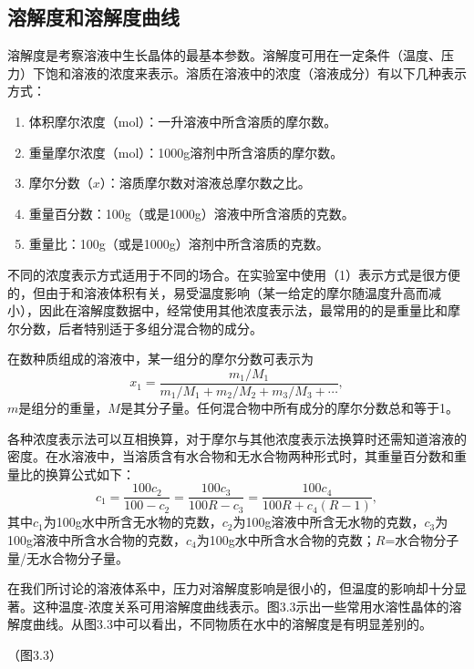 ﻿\subsection{溶解度和溶解度曲线}
溶解度是考察溶液中生长晶体的最基本参数。溶解度可用在一定条件（温度、压力）下饱和溶液的浓度来表示。溶质在溶液中的浓度（溶液成分）有以下几种表示方式：
\begin{enumerate}[(1)]\itemsep -0.5ex
\item 体积摩尔浓度（mol）：一升溶液中所含溶质的摩尔数。
\item 重量摩尔浓度（mol）：1000g溶剂中所含溶质的摩尔数。
\item 摩尔分数（$x$）：溶质摩尔数对溶液总摩尔数之比。
\item 重量百分数：100g（或是1000g）溶液中所含溶质的克数。
\item 重量比：100g（或是1000g）溶剂中所含溶质的克数。
\end{enumerate}

不同的浓度表示方式适用于不同的场合。在实验室中使用（1）表示方式是很方便的，但由于和溶液体积有关，易受温度影响（某一给定的摩尔随温度升高而减小），因此在溶解度数据中，经常使用其他浓度表示法，最常用的的是重量比和摩尔分数，后者特别适于多组分混合物的成分。

在数种质组成的溶液中，某一组分的摩尔分数可表示为
\begin{equation}
x_1=\frac{m_1/M_1}{m_1/M_1+m_2/M_2+m_3/M_3+\cdots},
\end{equation}
$m$是组分的重量，$M$是其分子量。任何混合物中所有成分的摩尔分数总和等于1。

各种浓度表示法可以互相换算，对于摩尔与其他浓度表示法换算时还需知道溶液的密度。在水溶液中，当溶质含有水合物和无水合物两种形式时，其重量百分数和重量比的换算公式如下：
\begin{equation}
c_1=\frac{100c_2}{100-c_2}=\frac{100c_3}{100R-c_3}=\frac{100c_4}{100R+c_4(R-1)},
\end{equation}
其中$c_1$为100g水中所含无水物的克数，$c_2$为100g溶液中所含无水物的克数，$c_3$为100g溶液中所含水合物的克数，$c_4$为100g水中所含水合物的克数；$R$=水合物分子量/无水合物分子量。

在我们所讨论的溶液体系中，压力对溶解度影响是很小的，但温度的影响却十分显著。这种温度-浓度关系可用溶解度曲线表示。图3.3示出一些常用水溶性晶体的溶解度曲线。从图3.3中可以看出，不同物质在水中的溶解度是有明显差别的。

（图3.3）

